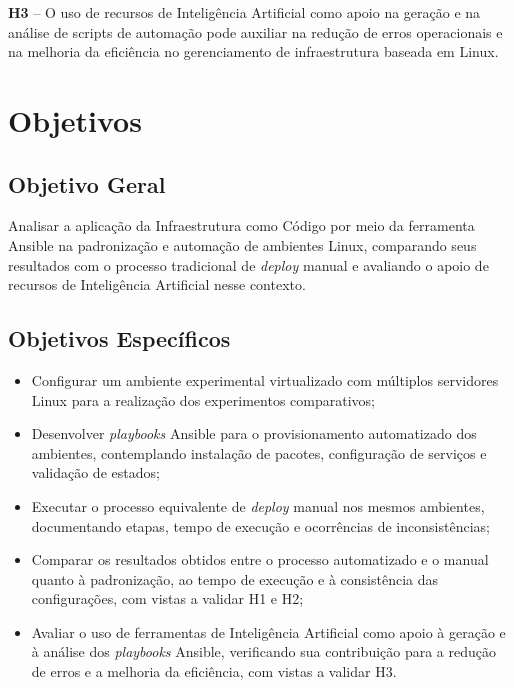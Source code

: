 \documentclass[12pt]{article}
\begin{document}
\textbf{H3} -- O uso de recursos de Inteligência Artificial como apoio na geração e na análise de scripts de automação pode auxiliar na redução de erros operacionais e na melhoria da eficiência no gerenciamento de infraestrutura baseada em Linux.

\section{Objetivos}
\subsection{Objetivo Geral}

Analisar a aplicação da Infraestrutura como Código por meio da ferramenta Ansible na padronização e automação de ambientes Linux, comparando seus resultados com o processo tradicional de \textit{deploy} manual e avaliando o apoio de recursos de Inteligência Artificial nesse contexto.

\subsection{Objetivos Específicos}
\begin{itemize}
\item Configurar um ambiente experimental virtualizado com múltiplos servidores Linux para a realização dos experimentos comparativos;
\item Desenvolver \textit{playbooks} Ansible para o provisionamento automatizado dos ambientes, contemplando instalação de pacotes, configuração de serviços e validação de estados;
\item Executar o processo equivalente de \textit{deploy} manual nos mesmos ambientes, documentando etapas, tempo de execução e ocorrências de inconsistências;
\item Comparar os resultados obtidos entre o processo automatizado e o manual quanto à padronização, ao tempo de execução e à consistência das configurações, com vistas a validar H1 e H2;
\item Avaliar o uso de ferramentas de Inteligência Artificial como apoio à geração e à análise dos \textit{playbooks} Ansible, verificando sua contribuição para a redução de erros e a melhoria da eficiência, com vistas a validar H3.
\end{itemize}

\end{document}
